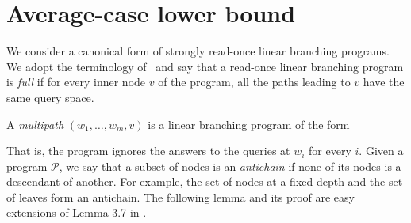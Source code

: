 \documentclass[a4paper,11pt,draft]{article}
\theoremstyle{definition}
\theoremstyle{remark}
\newcommand{\calP}{\mathcal{P}}
\newcommand{\sreadonce}{strongly read-once}
\newcommand{\readonce}{read-once}
\begin{document}
\section{Average-case lower bound}

We consider a canonical form of \sreadonce{} linear branching programs. We adopt the terminology of~\cite{DBLP:journals/cc/ChenKKSZ15} and say that a \readonce{} linear branching program is \emph{full} if for every inner node $v$ of the program, all the paths leading to $v$ have the same query space.

A \emph{multipath} $(w_1, \ldots, w_m, v)$ is a linear branching program of the form
\begin{center}
\end{center}

That is, the program ignores the answers to the queries at $w_i$ for every $i$. Given a program $\calP$, we say that a subset of nodes is an \emph{antichain} if none of its nodes is a descendant of another. For example, the set of nodes at a fixed depth and the set of leaves form an antichain. The following lemma and its proof are easy extensions of Lemma 3.7 in \cite{DBLP:journals/cc/ChenKKSZ15}.
\end{document}
